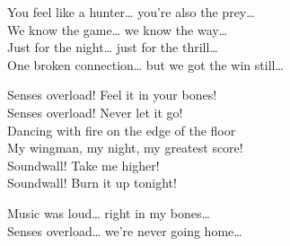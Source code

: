 \begin{lyrics}
You feel like a hunter… you’re also the prey…\\
We know the game… we know the way…\\
Just for the night… just for the thrill…\\
One broken connection… but we got the win still…

Senses overload! Feel it in your bones!\\
Senses overload! Never let it go!\\
Dancing with fire on the edge of the floor\\
My wingman, my night, my greatest score!\\
Soundwall! Take me higher!\\
Soundwall! Burn it up tonight!

Music was loud… right in my bones…\\
Senses overload… we’re never going home…
\end{lyrics}

